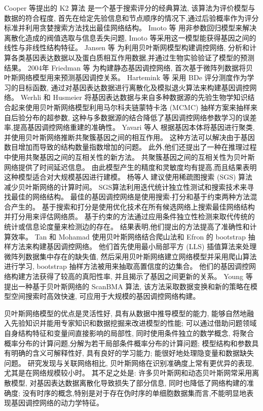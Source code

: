 Cooper 等提出的 K2 算法  是一个基于搜索评分的经典算法,
该算法为评价模型与数据的符合程度,
首先在给定先验信息和节点顺序的情况下,通过后验概率作为评分标准并利用贪婪搜索方法找出最佳网络结构。
Imoto 等  用非参数回归模型来解决离散化造成的阀值选取与信息丢失问题,
Imoto 等采用这一模型能获得基因之间的线性与非线性结构特征。
Jansen 等  为利用贝叶斯网模型构建调控网络,
分析和计算各类基因表达数据以及蛋白质相互作用数据,并通过生物实验验证了模型的预测结果。
2004年 Friedman 等  为构建静态基因调控网络,
首次基于微阵列数据将贝叶斯网络模型用来预测基因调控关系。
Hartemink 等  采用 BDe 评分测度作为学习的目标函数,
通过对基因表达数据进行离散化及模拟退火算法来构建基因调控网络。
Werhli 和 Husmeier  将基因表达数据与来自多种数据源的先验生物学知识结合起来使用贝叶斯网络模型利用马尔科夫链蒙特卡洛 (MCMC) 抽样方案来抽样来自后验分布的超参数,
这种与多数据源的结合降低了基因调控网络参数学习的误差率,提高基因调控网络重建的准确性。
Yavari 等人  根据基因本体将基因进行聚类,
并使用贝叶斯网络推断共聚簇基因之间的相互作用。
这种方法可以解决由于基因数目增加而导致的结构数量指数增加的问题。 
此外,他们还提出了一种在推理过程中使用共聚基因之间的互相关性的新方法。
共聚簇基因之间的互相关性为贝叶斯网络提供了时间延迟信息。 
由此模型产生的精度和灵敏度均有提高,而且结果表明这种模型适合对大规模基因进行建模。
杨等人  建议使用稀疏图搜索 (SGS) 算法减少贝叶斯网络的计算时间。
SGS算法利用迭代统计独立性测试和搜索技术来寻找最佳的网络结构。
最佳的基因调控网络是使用搜索-打分和基于约束两种方法混合产生的。
基于搜索和打分是使用优化技术在所有候选网络上搜索最佳网络结构并打分用来评估网络质。
基于约束的方法通过应用条件独立性检测来取代传统的统计或信息论度量来检测边的存在。
结果表明,他们提出的方法提高了准确性和计算效率。
Tan 和 Mohamad  使用贝叶斯网络结合爬山法和 Efron 的 bootstrap 抽样方法来构建基因调控网络。
他们首先使用最小局部平方 (LLS) 插值算法来处理微阵列数据集中存在的缺失值, 
然后采用贝叶斯网络建立网络模型并采用爬山算法进行学习, 
bootstrap 抽样方法被用来抽取高置信度的边集合。
他们的基因调控网络构建方法获得了较高的真阳性率, 并且揭示了基因之间更新的关系。 
Young 等  提出一种基于贝叶斯网络的 ScanBMA 算法,
该方法采取数据变换和新的策略在模型空间搜索时高效快速,
可应用于大规模的基因调控网络构建。

贝叶斯网络模型的优点是灵活性好, 具有从数据中推导模型的能力, 能够自然地融入先验知识并能用专家知识和数据挖掘来改进模型的性能;
可以通过借助问题领域自身结构特征和变量间直接影响的局部性, 同时使用条件独立的数学概念, 将聚合概率分布的计算问题,分解为若干局部条件概率分布的计算问题;
模型结构和参数具有明确的含义可解释性好, 具有良好的学习能力; 能很好地处理隐变量和数据缺失问题。
研究发现与关联网络相比, 贝叶斯网络在识别准确度上常有更优异的表现, 尤其是在网络规模较小时。
其不足之处是: 许多贝叶斯网和动态贝叶斯网常采用离散模型, 对基因表达数据离散化导致损失了部分信息,
同时也降低了网络构建的准确度;
没有时序的概念,特别是对于存在伪时序的单细胞数据集而言,不能明显地表现基因调控网络的动力学特征。

